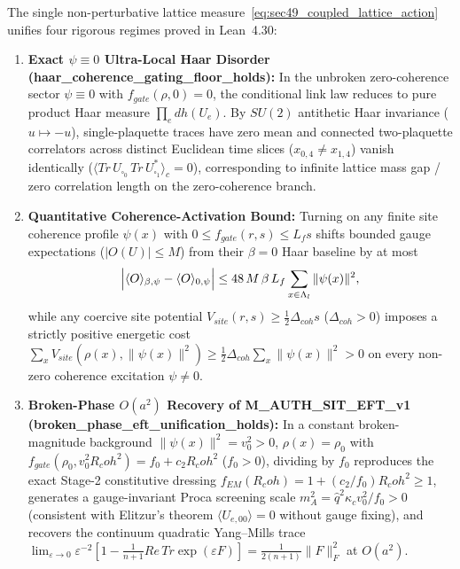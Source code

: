 \documentclass[american,11pt,letterpaper]{article}
\newcommand{\Rcoh}{R_{\mathrm{coh}}}
\def\mathrm#1{#1}%
\def\texttt#1{#1}%
\def\Rcoh{R_coh}%
\begin{document}
The single non-perturbative lattice measure~\eqref{eq:sec49_coupled_lattice_action} unifies four rigorous regimes proved in Lean~4.30:
\begin{enumerate}[leftmargin=2em]
  \item \textbf{Exact $\psi \equiv 0$ Ultra-Local Haar Disorder (\texttt{haar\_\allowbreak{}coherence\_\allowbreak{}gating\_\allowbreak{}floor\_\allowbreak{}holds}):} In the unbroken zero-coherence sector $\psi \equiv 0$ with $f_{\mathrm{gate}}(\rho,0) = 0$, the conditional link law reduces to pure product Haar measure $\prod_e dh(U_e)$. By $SU(2)$ antithetic Haar invariance ($u \mapsto -u$), single-plaquette traces have zero mean and connected two-plaquette correlators across distinct Euclidean time slices ($x_{0,4} \ne x_{1,4}$) vanish identically ($\langle \mathrm{Tr}\,U_{\square_0}\,\mathrm{Tr}\,U_{\square_1}^*\rangle_c = 0$), corresponding to infinite lattice mass gap / zero correlation length on the zero-coherence branch.
  \item \textbf{Quantitative Coherence-Activation Bound:} Turning on any finite site coherence profile $\psi(x)$ with $0 \le f_{\mathrm{gate}}(r,s) \le L_f s$ shifts bounded gauge expectations ($|O(U)| \le M$) from their $\beta = 0$ Haar baseline by at most
  \begin{equation}
  \Bigl|\langle O\rangle_{\beta,\psi} - \langle O\rangle_{0,\psi}\Bigr|
  \le 48\,M\,\beta\,L_f\sum_{x\in\Lambda_l}\|\psi(x)\|^2,
  \label{eq:sec49_48_bound}
  \end{equation}
  while any coercive site potential $V_{\mathrm{site}}(r,s) \ge \frac{1}{2}\Delta_{\mathrm{coh}} s$ ($\Delta_{\mathrm{coh}} > 0$) imposes a strictly positive energetic cost $\sum_x V_{\mathrm{site}}(\rho(x),\|\psi(x)\|^2) \ge \frac{1}{2}\Delta_{\mathrm{coh}}\sum_x\|\psi(x)\|^2 > 0$ on every non-zero coherence excitation $\psi \ne 0$.
  \item \textbf{Broken-Phase $O(a^2)$ Recovery of \texttt{M\_AUTH\_SIT\_EFT\_v1} (\texttt{broken\_\allowbreak{}phase\_\allowbreak{}eft\_\allowbreak{}unification\_\allowbreak{}holds}):} In a constant broken-magnitude background $\|\psi(x)\|^2 = v_0^2 > 0$, $\rho(x) = \rho_0$ with $f_{\mathrm{gate}}(\rho_0, v_0^2\Rcoh^2) = f_0 + c_2\Rcoh^2$ ($f_0 > 0$), dividing by $f_0$ reproduces the exact Stage-2 constitutive dressing $f_{\mathrm{EM}}(\Rcoh) = 1 + (c_2/f_0)\Rcoh^2 \ge 1$, generates a gauge-invariant Proca screening scale $m_A^2 = \hat{q}^2\kappa_c v_0^2 / f_0 > 0$ (consistent with Elitzur's theorem $\langle U_{e,00}\rangle = 0$ without gauge fixing), and recovers the continuum quadratic Yang--Mills trace $\lim_{\varepsilon\to 0}\varepsilon^{-2}[1 - \frac{1}{n+1}\mathrm{Re}\,\mathrm{Tr}\exp(\varepsilon F)] = \frac{1}{2(n+1)}\|F\|_F^2$ at $O(a^2)$.

\end{enumerate}
\end{document}
